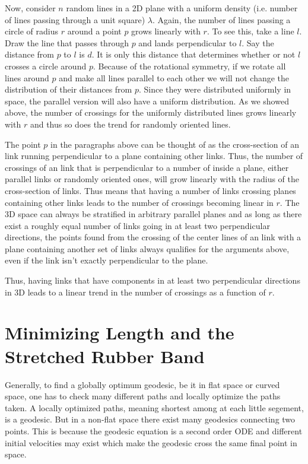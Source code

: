 \documentclass[nofootinbib,preprint,floatfix,titlepage,endfloats,superscriptaddress]{revtex4} %
\begin{document}
Now, consider $n$ random lines in a 2D plane with a uniform density (i.e. number of lines passing through a unit square) $\lambda$. Again, the number of lines passing a circle of radius $r$ around a point $p$ grows linearly with $r$. To see this, take a line $l$. Draw the line that passes through $p$ and lands perpendicular to $l$. Say the distance from $p$ to $l$ is $d$. It is only this distance that determines whether or not $l$ crosses a circle around $p$. Because of the rotational symmetry, if we rotate all lines around $p$ and make all lines parallel to each other we will not change the distribution of their distances from $p$. Since they were distributed uniformly in space, the parallel version will also have a uniform distribution. As we showed above, the number of crossings for the uniformly distributed lines grows linearly with $r$ and thus so does the trend for randomly oriented lines. 

The point $p$ in the paragraphs above can be thought of as the cross-section of an link running perpendicular to a plane containing other links. Thus, the number of crossings of an link that is perpendicular to a number of inside a plane, either parallel links or randomly oriented ones, will grow linearly with the radius of the cross-section of links. Thus means that having a number of links crossing planes containing other links leads to the number of crossings becoming linear in $r$. The 3D space can always be stratified in arbitrary parallel planes and as long as there exist a roughly equal number of links going in at least two perpendicular directions, the points found from the crossing of the center lines of an link with a plane containing another set of links always qualifies for the arguments above, even if the link isn't exactly perpendicular to the plane. 

Thus, having links that have components in at least two perpendicular directions in 3D leads to a linear trend in the number of crossings as a function of $r$.  



\section{Minimizing Length and the Stretched Rubber Band\label{ap:affine}}
Generally, to find a globally optimum geodesic, be it in flat space or curved space, one has to check many different paths and locally optimize the paths taken. A locally optimized paths, meaning shortest among at each little segement, is a geodesic. But in a non-flat space there exist many geodesics connecting two points. This is because the geodesic equation is a second order ODE and different initial velocities may exist which make the geodesic cross the same final point in space. 
\end{document}
